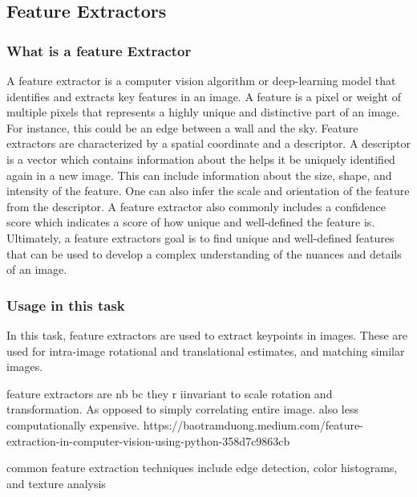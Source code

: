 
\subsection*{Feature Extractors}


\subsubsection*{What is a feature Extractor}
A feature extractor is a computer vision algorithm or deep-learning model that identifies and extracts key features in an image. A feature is a pixel or weight of multiple pixels that represents a highly unique and distinctive part of an image. For instance, this could be an edge between a wall and the sky. Feature extractors are characterized by a spatial coordinate and a descriptor. A descriptor is a vector which contains information about the helps it be uniquely identified again in a new image. This can include information about the size, shape, and intensity of the feature. One can also infer the scale and orientation of the feature from the descriptor. A feature extractor also commonly includes a confidence score which indicates a score of how unique and well-defined the feature is. Ultimately, a feature extractors goal is to find unique and well-defined features that can be used to develop a complex understanding of the nuances and details of an image.
\subsubsection*{Usage in this task}
In this task, feature extractors are used to extract keypoints in images. These are used for intra-image rotational and translational estimates, and matching similar images. 



feature extractors are nb bc they r iinvariant to scale rotation and transformation. As opposed to simply correlating entire image. also less computationally expensive.
https://baotramduong.medium.com/feature-extraction-in-computer-vision-using-python-358d7c9863cb



common feature extraction techniques include edge detection, color histograms, and texture analysis



